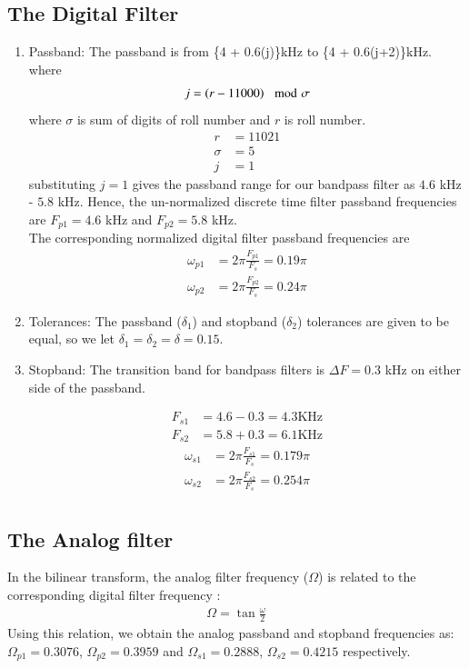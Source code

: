 \documentclass{article}
\begin{document}
\subsection{The Digital Filter}
\begin{enumerate}
\item {Passband:}
The passband is from \{4 + 0.6(j)\}kHz to \{4 + 0.6(j+2)\}kHz. \\
where 
\begin{align}
    j=\left(r-11000\right) \mod \sigma
\end{align}
where $\sigma$ is sum of digits of roll number and $r$ is roll number.\\
\begin{align}
    r&=11021\\
    \sigma  &= 5\\
    j&=1
\end{align}
 substituting $j =1$ gives the passband
range for our bandpass filter as $4.6$ kHz - $5.8$ kHz.  Hence, the un-normalized discrete time filter
passband frequencies are $F_{p1} = 4.6$ kHz
and $F_{p2} = 5.8$ kHz. \\
The corresponding normalized digital filter passband frequencies are
\begin{align}
    \omega_{p1} &= 2\pi\frac{F_{p1}}{F_s} = 0.19 \pi\\
    \omega_{p2} &= 2\pi\frac{F_{p2}}{F_s}  =0.24 \pi
\end{align}

\item {Tolerances:}  The passband ($\delta_1$) and stopband ($\delta_2$) tolerances are given to
be equal, so we let $\delta_1 = \delta_2 = \delta = 0.15$.

\item { Stopband:}  The {transition band} for bandpass filters is $\Delta F = 0.3$ kHz on either side of the passband.

\begin{align}
    F_{s1} &= 4.6-0.3 = 4.3 \text{KHz}\\
    F	_{s2} &= 5.8+0.3 = 6.1  \text{KHz}
\end{align}
\begin{align}
    \omega_{s1} &= 2\pi\frac{F_{s1}}{F_s} = 0.179 \pi\\
     \omega_{s2} &= 2\pi\frac{F_{s2}}{F_s} = 0.254 \pi\\
\end{align}
\end{enumerate}
\subsection{The Analog filter}
In the bilinear transform, the analog filter frequency ($\Omega$) is related to the corresponding digital filter frequency\brak{\omega} :
\begin{align}
  \Omega = \tan \frac{\omega}{2}  
\end{align}
Using this relation, we obtain the analog passband and stopband frequencies as:
$\Omega_{p1} = 0.3076$, $\Omega_{p2} = 0.3959$ and $\Omega_{s1} = 0.2888$, $\Omega_{s2} = 0.4215$
respectively.
\end{document}
